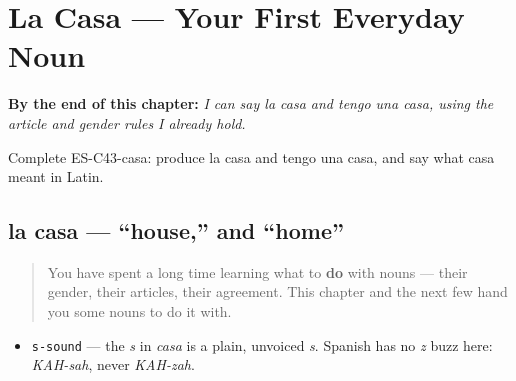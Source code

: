 
\chapter{La Casa --- Your First Everyday Noun}
\label{ch:noun-casa}

\begin{chapteropening}
\textbf{By the end of this chapter:} \emph{I can say la casa and tengo una casa, using the article and gender rules I already hold.}

Complete ES-C43-casa: produce la casa and tengo una casa, and say what casa meant in Latin.
\end{chapteropening}

\section[la casa]{la casa — \textquotedblleft{}house,\textquotedblright{} and \textquotedblleft{}home\textquotedblright{}}

\label{lesson:ES-C43-casa}



\begin{quote}
You have spent a long time learning what to \textbf{do} with nouns — their gender, their articles, their agreement. This chapter and the next few hand you some nouns to do it with.
\end{quote}

\begin{sounds}
\begin{itemize}
\raggedright
  \item \texttt{s-sound} — the \emph{s} in \emph{casa} is a plain, unvoiced \emph{s}. Spanish has no \emph{z} buzz here: \emph{KAH-sah}, never \emph{KAH-zah}.
\end{itemize}
\end{sounds}

